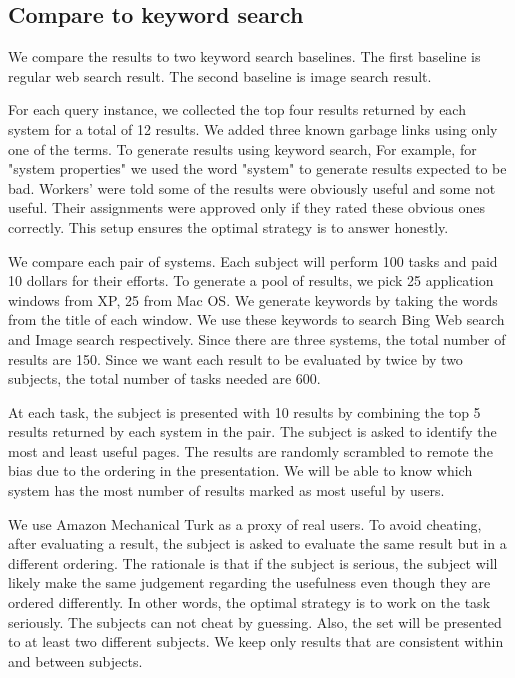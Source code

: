 \documentclass{www2010-submission}
\begin{document}
\subsection{Compare to keyword search}

We compare the results to two keyword search baselines. The first
baseline is regular web search result. The second baseline is
image search result.

For each query instance, we collected the top four results
returned by each system for a total of 12 results. We added three
known garbage links using only one of the terms. To generate
results using keyword search, For example, for "system properties"
we used the word "system" to generate results expected to be bad.
Workers' were told some of the results were obviously useful and
some not useful. Their assignments were approved only if they
rated these obvious ones correctly. This setup ensures the optimal
strategy is to answer honestly.

We compare each pair of systems. Each subject will perform 100
tasks and paid 10 dollars for their efforts. To generate a pool of
results, we pick 25 application windows from XP, 25 from Mac OS.
We generate keywords by taking the words from the title of each
window. We use these keywords to search Bing Web search and Image
search respectively. Since there are three systems, the total
number of results are 150. Since we want each result to be
evaluated by twice by two subjects, the total number of tasks
needed are 600.

At each task, the subject is presented with 10 results by
combining the top 5 results returned by each system in the pair.
The subject is asked to identify the most and least useful pages.
The results are randomly scrambled to remote the bias due to the
ordering in the presentation. We will be able to know which system
has the most number of results marked as most useful by users.

We use Amazon Mechanical Turk as a proxy of real users. To avoid
cheating, after evaluating a result, the subject is asked to
evaluate the same result but in a different ordering. The
rationale is that if the subject is serious, the subject will
likely make the same judgement regarding the usefulness even
though they are ordered differently. In other words, the optimal
strategy is to work on the task seriously. The subjects can not
cheat by guessing. Also, the set will be presented to at least two
different subjects. We keep only results that are consistent
within and between subjects.
\end{document}
